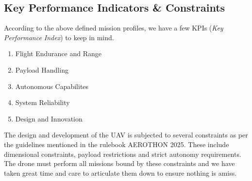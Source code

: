 \documentclass[12pt]{report}
\begin{document}
    \subsection{Key Performance Indicators \& Constraints}
    According to the above defined mission profiles, we have a few KPIs (\textit{Key Performance Index}) to keep in mind.
    \begin{enumerate}
      \item Flight Endurance and Range 
      \item Payload Handling 
      \item Autonomous Capabilites
      \item System Reliability
      \item Design and Innovation
    \end{enumerate}
        The design and development of the UAV is subjected to several constraints as per the guidelines mentioned in the rulebook AEROTHON 2025. These include dimensional constraints, payload restrictions and strict autonomy requirements. The drone must perform all missions bound by these constraints and we have taken great time and care to articulate them down to ensure nothing is amiss.
\end{document}
